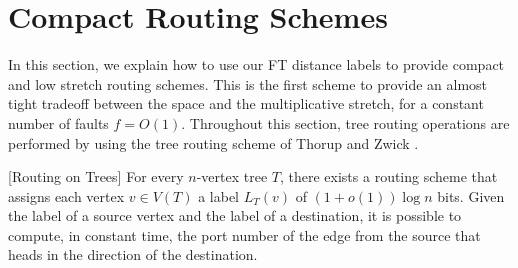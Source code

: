 \section{Compact Routing Schemes}
In this section, we explain how to use our FT distance labels to provide compact and low stretch routing schemes. This is the first scheme to provide an almost tight tradeoff between the space and the multiplicative stretch, for a constant number of faults $f=O(1)$.  Throughout this section, tree routing operations are performed by using the tree routing scheme of Thorup and Zwick \cite{thorup2001compact}.
\begin{fact}\label{fc:route-trees}[Routing on Trees]\cite{thorup2001compact}
For every $n$-vertex tree $T$, there exists a routing scheme that assigns each vertex $v \in V(T)$ a label $L_T(v)$ of $(1+o(1))\log n$ bits. Given the label of a source vertex
and the label of a destination, it is possible to compute, in constant time, the port number of the edge from the source that heads in the direction of the destination.
\end{fact}


%
%


